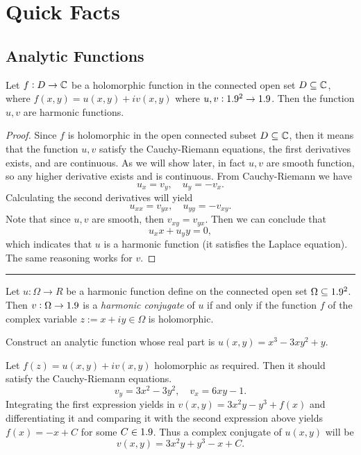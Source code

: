 \section{Quick Facts}

\subsection{Analytic Functions}

\begin{fact}
	Let $f: D \to \mathbb{C}$ be a holomorphic function in the connected open set $D \subseteq \mathbb{C}$, where $f(x,y) = u(x,y) + i v(x,y)$ where $u,v: 1.9^2 \to 1.9$. Then the function $u,v$ are harmonic functions.
\end{fact}

\begin{proof}
	Since $f$ is holomorphic in the open connected subset $D \subseteq \mathbb{C}$, then it means that the function $u,v$ satisfy the Cauchy-Riemann equations, the first derivatives exists, and are continuous. As we will show later, in fact $u,v$ are smooth function, so any higher derivative exists and is continuous.
	From Cauchy-Riemann we have
	\[ u_x = v_y, \quad u_y = - v_x. \]
	Calculating the second derivatives will yield
	\[ u_{xx} = v_{yx}, \quad u_{yy} = -v_{xy}. \]
	Note that since $u,v$ are smooth, then $v_{xy} = v_{yx}$. Then we can conclude that 
	\[ u_xx + u_yy = 0, \]
	which indicates that $u$ is a harmonic function (it satisfies the Laplace equation). The same reasoning works for $v$.
\end{proof}

\hrule

\begin{fact}
	Let $u: \Omega \to R$ be a harmonic function define on the connected open set $\Omega \subseteq 1.9^2$. Then $v: \Omega \to 1.9$ is a \emph{harmonic conjugate} of $u$ if and only if the function $f$ of the complex variable $z := x+iy \in \Omega $ is holomorphic.
\end{fact}

\begin{exm}
	\label{exm:harmonicConjugateExample}
	Construct an analytic function whose real part is $u(x,y) = x^3 - 3xy^2 + y$.
\end{exm}


\begin{answer}
	Let $f(z) = u(x,y)+i v(x,y)$ holomorphic as required. Then it should satisfy the Cauchy-Riemann equations.
	\[ v_y = 3x^2 - 3y^2 , \quad v_x = 6xy -1. \]
	Integrating the first expression yields in  $v(x,y) = 3x^2y - y^3 + f(x)$ and differentiating it and comparing it with the second expression above yields $f(x) = -x + C$ for some $C \in 1.9$. Thus a complex conjugate of $u(x,y)$ will be
	\[ v(x,y) = 3x^2y + y^3 - x + C. \]
\end{answer}

